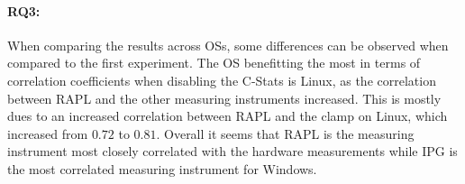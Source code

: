 \paragraph{RQ3:} When comparing the results across OSs, some differences can be observed when compared to the first experiment. The OS benefitting the most in terms of correlation coefficients when disabling the C-Stats is Linux, as the correlation between RAPL and the other measuring instruments increased. This is mostly dues to an increased correlation between RAPL and the clamp on Linux, which increased from $0.72$ to $0.81$.  Overall it seems that RAPL is the measuring instrument most closely correlated with the hardware measurements while IPG is the most correlated measuring instrument for Windows.





%  


% 

% 


